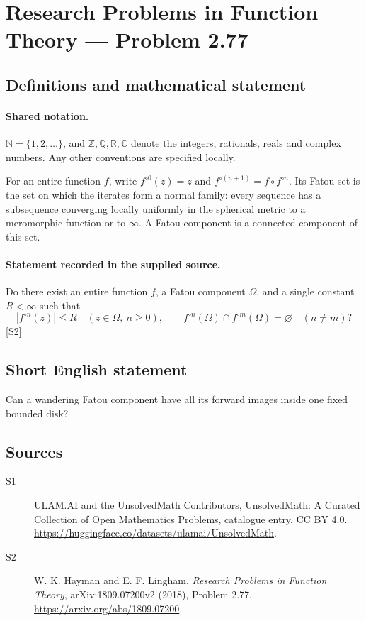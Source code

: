 \documentclass[11pt]{article}
\newcommand{\sref}[2]{\hyperlink{source:#1:#2}{[S#2]}}
\begin{document}
\section{Research Problems in Function Theory — Problem 2.77}\label{statement}

\subsection{Definitions and mathematical statement}

\paragraph{Shared notation.}$\mathbb N=\{1,2,\ldots\}$, and $\mathbb Z,\mathbb Q,\mathbb R,\mathbb C$ denote the integers, rationals, reals and complex numbers. Any other conventions are specified locally.


For an entire function $f$, write $f^{\circ0}(z)=z$ and $f^{\circ(n+1)}=f\circ f^{\circ n}$. Its Fatou set is the set on which the iterates form a normal family: every sequence has a subsequence converging locally uniformly in the spherical metric to a meromorphic function or to $\infty$. A Fatou component is a connected component of this set.
\paragraph{Statement recorded in the supplied source.}
Do there exist an entire function $f$, a Fatou component $\Omega$, and a single constant $R<\infty$ such that
\[|f^{\circ n}(z)|\leq R\quad(z\in\Omega,\ n\geq0),\qquad
f^{\circ n}(\Omega)\cap f^{\circ m}(\Omega)=\varnothing\quad(n\ne m)?\] \sref{statement}{2}
\subsection{Short English statement}
Can a wandering Fatou component have all its forward images inside one fixed bounded disk?
\subsection{Sources}
\begin{description}
\item[\hypertarget{source:statement:1}{S1}] ULAM.AI and the UnsolvedMath Contributors, UnsolvedMath: A Curated Collection of Open Mathematics Problems, catalogue entry. CC BY 4.0. \url{https://huggingface.co/datasets/ulamai/UnsolvedMath}.
\item[\hypertarget{source:statement:2}{S2}] W. K. Hayman and E. F. Lingham, \emph{Research Problems in Function Theory}, arXiv:1809.07200v2 (2018), Problem 2.77. \url{https://arxiv.org/abs/1809.07200}.
\end{description}
\label{end:statement}
\end{document}
